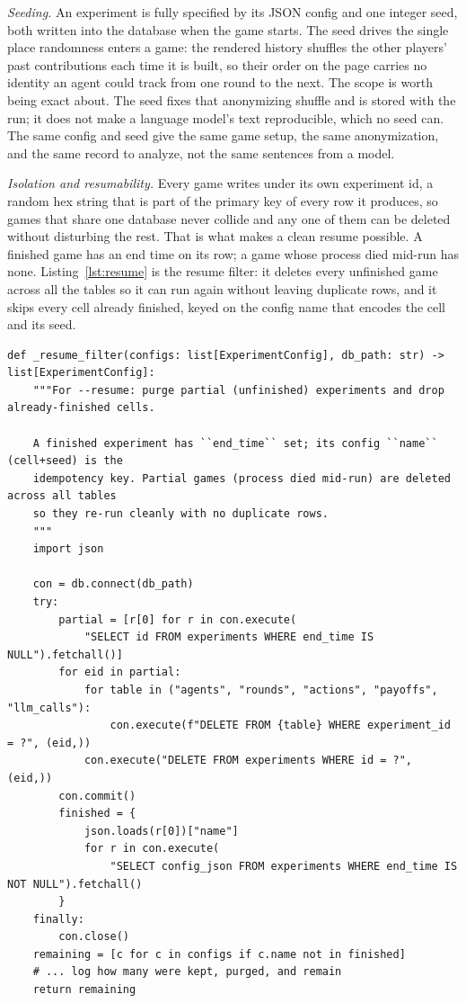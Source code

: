 \emph{Seeding.} An experiment is fully specified by its JSON config and one integer
seed, both written into the database when the game starts. The seed drives the single
place randomness enters a game: the rendered history shuffles the other players' past
contributions each time it is built, so their order on the page carries no identity an
agent could track from one round to the next. The scope is worth being exact about. The
seed fixes that anonymizing shuffle and is stored with the run; it does not make a
language model's text reproducible, which no seed can. The same config and seed give the
same game setup, the same anonymization, and the same record to analyze, not the same
sentences from a model.

\emph{Isolation and resumability.} Every game writes under its own experiment id, a
random hex string that is part of the primary key of every row it produces, so games
that share one database never collide and any one of them can be deleted without
disturbing the rest. That is what makes a clean resume possible. A finished game has an
end time on its row; a game whose process died mid-run has none. Listing~\ref{lst:resume}
is the resume filter: it deletes every unfinished game across all the tables so it can
run again without leaving duplicate rows, and it skips every cell already finished, keyed
on the config name that encodes the cell and its seed.

\begin{lstlisting}[caption={The idempotent resume (\texttt{scripts/run\_production.py}, a status print abridged): partial runs are purged row by row, finished cells are recognized by config name and skipped, so re-running the matrix completes only what is missing.}, label={lst:resume}]
def _resume_filter(configs: list[ExperimentConfig], db_path: str) -> list[ExperimentConfig]:
    """For --resume: purge partial (unfinished) experiments and drop already-finished cells.

    A finished experiment has ``end_time`` set; its config ``name`` (cell+seed) is the
    idempotency key. Partial games (process died mid-run) are deleted across all tables
    so they re-run cleanly with no duplicate rows.
    """
    import json

    con = db.connect(db_path)
    try:
        partial = [r[0] for r in con.execute(
            "SELECT id FROM experiments WHERE end_time IS NULL").fetchall()]
        for eid in partial:
            for table in ("agents", "rounds", "actions", "payoffs", "llm_calls"):
                con.execute(f"DELETE FROM {table} WHERE experiment_id = ?", (eid,))
            con.execute("DELETE FROM experiments WHERE id = ?", (eid,))
        con.commit()
        finished = {
            json.loads(r[0])["name"]
            for r in con.execute(
                "SELECT config_json FROM experiments WHERE end_time IS NOT NULL").fetchall()
        }
    finally:
        con.close()
    remaining = [c for c in configs if c.name not in finished]
    # ... log how many were kept, purged, and remain
    return remaining
\end{lstlisting}

